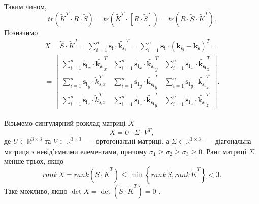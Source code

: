 Таким чином,
\begin{equation*}
  tr \left( \tilde{K}^T \cdot R \cdot \tilde{S} \right) =
  tr \left( \tilde{K}^T \cdot \left[ R \cdot \tilde{S} \right] \right) =
  tr \left( R \cdot \tilde{S} \cdot \tilde{K}^T \right).
\end{equation*}
Позначимо
\begin{equation*}
  \begin{gathered}
    X =
    \tilde{S} \cdot \tilde{K}^T =
    \sum \limits_{i = 1}^n \tilde{\boldsymbol{s_i}} \cdot \tilde{\boldsymbol{k_{s_i}}}^T =
    \sum \limits_{i = 1}^n
      \tilde{\boldsymbol{s_i}} \cdot \left( \boldsymbol{k_{s_i}} - \overline{\boldsymbol{k}}_{\boldsymbol{s}} \right)^T = \\
    = \begin{bmatrix}
      \sum \limits_{i = 1}^n \tilde{\boldsymbol{s_i}}_x \cdot \tilde{\boldsymbol{k_{s_i}}}_x^T & \sum \limits_{i = 1}^n \tilde{\boldsymbol{s_i}}_x \cdot \tilde{\boldsymbol{k_{s_i}}}_y^T & \sum \limits_{i = 1}^n \tilde{\boldsymbol{s_i}}_x \cdot \tilde{\boldsymbol{k_{s_i}}}_z^T \\
      \sum \limits_{i = 1}^n \tilde{\boldsymbol{s_i}}_y \cdot \tilde{k}_{s_i x}^T & \sum \limits_{i = 1}^n \tilde{\boldsymbol{s_i}}_y \cdot \tilde{\boldsymbol{k_{s_i}}}_y^T & \sum \limits_{i = 1}^n \tilde{\boldsymbol{s_i}}_y \cdot \tilde{\boldsymbol{k_{s_i}}}_z^T \\
      \sum \limits_{i = 1}^n \tilde{\boldsymbol{s_i}}_z \cdot \tilde{k}_{s_i x}^T & \sum \limits_{i = 1}^n \tilde{\boldsymbol{s_i}}_z \cdot \tilde{\boldsymbol{k_{s_i}}}_y^T & \sum \limits_{i = 1}^n \tilde{\boldsymbol{s_i}}_z \cdot \tilde{\boldsymbol{k_{s_i}}}_z^T
    \end{bmatrix}.
  \end{gathered}
\end{equation*}

Візьмемо сингулярний розклад \cite{golub:svd} матриці $X$
\begin{equation}\label{eq:SVD}
  X = U \cdot \Sigma \cdot V^T,
\end{equation}
де $U \in \mathbb{R}^{3 \times 3}$ та
$V \in \mathbb{R}^{3 \times 3}$~---~ортогональні матриці,
а $ \Sigma \in \mathbb{R}^{3 \times 3}$~---~діагональна матриця
з невід'ємними елементами,
причому $ \sigma_1 \geq \sigma_2 \geq \sigma_3 \geq 0$.
Ранг матриці $ \Sigma $ менше трьох, якщо \cite{rankAB}
\begin{equation*}
  rank \, X =
  rank \left( \tilde{S} \cdot \tilde{K}^T \right) \leq
  \min \left\{ rank \, \tilde{S}, rank \, \tilde{K}^T \right\} < 3.
\end{equation*}
Таке можливо, якщо
$ \det{X} = \det{ \left( \tilde{S} \cdot \tilde{K}^T \right) } = 0$
\cite{faddeev:rank:det}.

